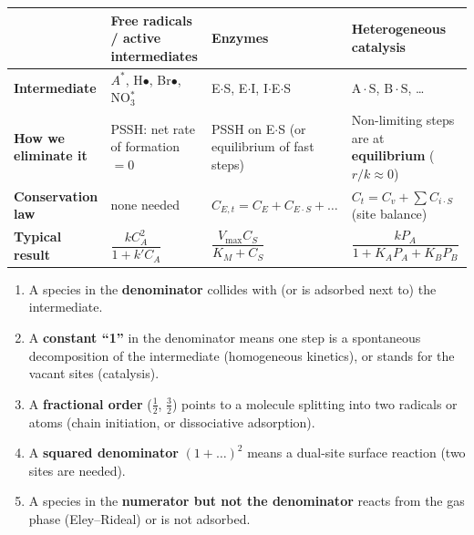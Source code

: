 \documentclass[11pt]{article}
\newcommand{\AS}[1]{\mathrm{#1\!\cdot\!S}}
\begin{document}
\begin{center}
\end{center}

\begin{center}
\renewcommand{\arraystretch}{1.25}
\begin{tabularx}{\textwidth}{>{\bfseries}l X X X}
\toprule
 & Free radicals / active intermediates & Enzymes & Heterogeneous catalysis \\
\midrule
Intermediate & $A^*$, H$\bullet$, Br$\bullet$, NO$_3^*$ & E$\cdot$S, E$\cdot$I, I$\cdot$E$\cdot$S & $\AS{A}$, $\AS{B}$, \ldots \\
How we eliminate it & PSSH: net rate of formation $=0$ & PSSH on E$\cdot$S (or equilibrium of fast steps) & Non-limiting steps are at \textbf{equilibrium} ($r/k\approx 0$) \\
Conservation law & none needed & $C_{E,t}=C_E+C_{E\cdot S}+\ldots$ & $C_t=C_v+\sum C_{i\cdot S}$ (site balance) \\
Typical result & $\dfrac{kC_A^2}{1+k'C_A}$ & $\dfrac{V_{\max}C_S}{K_M+C_S}$ & $\dfrac{kP_A}{1+K_AP_A+K_BP_B}$ \\
\bottomrule
\end{tabularx}
\end{center}

\begin{keyresult}
\begin{enumerate}
\item A species in the \textbf{denominator} collides with (or is adsorbed next to) the intermediate.
\item A \textbf{constant ``1''} in the denominator means one step is a spontaneous decomposition of the intermediate
(homogeneous kinetics), or stands for the vacant sites (catalysis).
\item A \textbf{fractional order} ($\tfrac12$, $\tfrac32$) points to a molecule splitting into two radicals or atoms
(chain initiation, or dissociative adsorption).
\item A \textbf{squared denominator} $(1+\ldots)^2$ means a dual-site surface reaction (two sites are needed).
\item A species in the \textbf{numerator but not the denominator} reacts from the gas phase (Eley--Rideal) or is not adsorbed.
\end{enumerate}
\end{keyresult}
\end{document}
